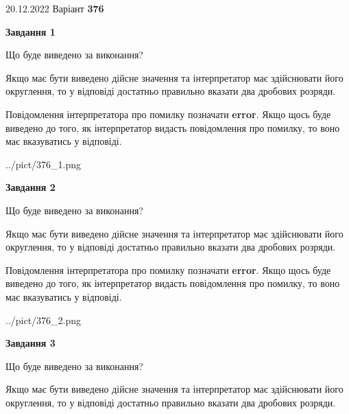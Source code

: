 \documentclass[12pt, ukrainian]{article}
\begin{document}
{20.12.2022 Варіант \No \textbf { 376 }\par}
{
\begin {Large}

{\begin {center}\textbf{Завдання 1}\end {center}}\par
Що буде виведено за виконання? \par

Якщо має бути виведено дійсне значення та інтерпретатор має здійснювати його округлення, 
то у відповіді достатньо правильно вказати два дробових розряди.

Повідомлення інтерпретатора про помилку позначати \textbf{error}.
Якщо щось буде виведено до того, як інтерпретатор видасть повідомлення про помилку, 
то воно має вказуватись у відповіді. \par

\begin{center}
	{../pict/376_1.png}
\end{center}
\newpage

{\begin {center}\textbf{Завдання 2}\end {center}}\par
Що буде виведено за виконання? \par

Якщо має бути виведено дійсне значення та інтерпретатор має здійснювати його округлення, 
то у відповіді достатньо правильно вказати два дробових розряди.

Повідомлення інтерпретатора про помилку позначати \textbf{error}.
Якщо щось буде виведено до того, як інтерпретатор видасть повідомлення про помилку, 
то воно має вказуватись у відповіді. \par

\begin{center}
	{../pict/376_2.png}
\end{center}
\newpage

{\begin {center}\textbf{Завдання 3}\end {center}}\par
Що буде виведено за виконання? \par

Якщо має бути виведено дійсне значення та інтерпретатор має здійснювати його округлення, 
то у відповіді достатньо правильно вказати два дробових розряди.


\end{Large}}
\end{document}

